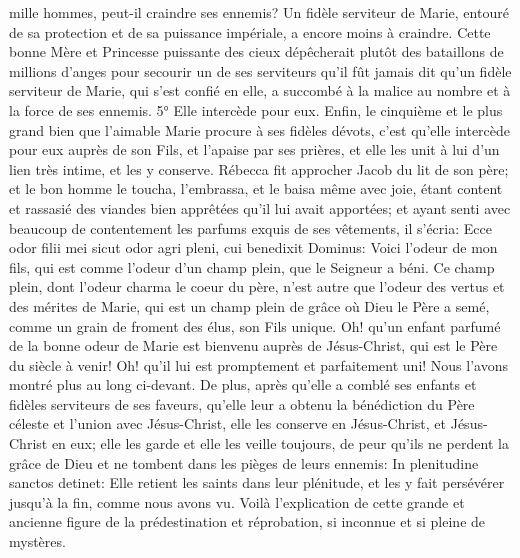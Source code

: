 mille hommes, peut-il craindre ses ennemis? Un fidèle serviteur de Marie, entouré de sa protection et de sa
puissance impériale, a encore moins à craindre. Cette bonne Mère et Princesse puissante des cieux dépêcherait
plutôt des bataillons de millions d'anges pour secourir un de ses serviteurs qu'il fût jamais dit qu'un fidèle serviteur
de Marie, qui s'est confié en elle, a succombé à la malice au nombre et à la force de ses ennemis.
5° Elle intercède pour eux.
 Enfin, le cinquième et le plus grand bien que l'aimable Marie procure à ses fidèles dévots, c'est qu'elle
intercède pour eux auprès de son Fils, et l'apaise par ses prières, et elle les unit à lui d'un lien très intime, et les y
conserve.
Rébecca fit approcher Jacob du lit de son père; et le bon homme le toucha, l'embrassa, et le baisa même avec
joie, étant content et rassasié des viandes bien apprêtées qu'il lui avait apportées; et ayant senti avec beaucoup de
contentement les parfums exquis de ses vêtements, il s'écria: Ecce odor filii mei sicut odor agri pleni, cui benedixit
Dominus: Voici l'odeur de mon fils, qui est comme l'odeur d'un champ plein, que le Seigneur a béni. Ce champ
plein, dont l'odeur charma le coeur du père, n'est autre que l'odeur des vertus et des mérites de Marie, qui est un
champ plein de grâce où Dieu le Père a semé, comme un grain de froment des élus, son Fils unique. Oh! qu'un
enfant parfumé de la bonne odeur de Marie est bienvenu auprès de Jésus-Christ, qui est le Père du siècle à venir!
Oh! qu'il lui est promptement et parfaitement uni! Nous l'avons montré plus au long ci-devant.
 De plus, après qu'elle a comblé ses enfants et fidèles serviteurs de ses faveurs, qu'elle leur a obtenu la
bénédiction du Père céleste et l'union avec Jésus-Christ, elle les conserve en Jésus-Christ, et Jésus-Christ en eux;
elle les garde et elle les veille toujours, de peur qu'ils ne perdent la grâce de Dieu et ne tombent dans les pièges
de leurs ennemis: In plenitudine sanctos detinet: Elle retient les saints dans leur plénitude, et les y fait persévérer
jusqu'à la fin, comme nous avons vu.
Voilà l'explication de cette grande et ancienne figure de la prédestination et réprobation, si inconnue et si pleine de
mystères.
